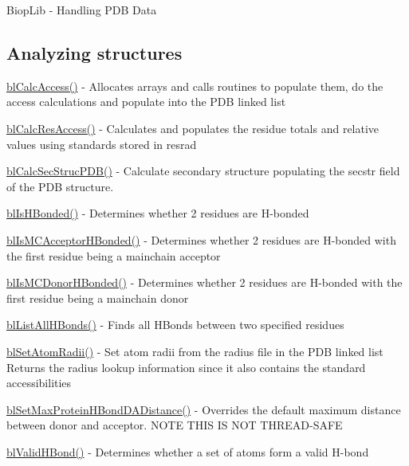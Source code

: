 Biop\-Lib -\/ Handling P\-D\-B Data

\subsection*{Analyzing structures }


\begin{DoxyItemize}
\item \hyperlink{access_8c_a25e95868bba0491487408f2a04f018cf}{bl\-Calc\-Access()} -\/ Allocates arrays and calls routines to populate them, do the access calculations and populate into the P\-D\-B linked list
\item \hyperlink{access_8c_a8665f8aad4742be11492028cfc816902}{bl\-Calc\-Res\-Access()} -\/ Calculates and populates the residue totals and relative values using standards stored in resrad
\item \hyperlink{secstr_8c_aca5046643e5b5b54b6c5732816ee2b5a}{bl\-Calc\-Sec\-Struc\-P\-D\-B()} -\/ Calculate secondary structure populating the secstr field of the P\-D\-B structure.
\item \hyperlink{hbond_8c_a0bbd4cd865d5a39fc21ab4bdfe1695e9}{bl\-Is\-H\-Bonded()} -\/ Determines whether 2 residues are H-\/bonded
\item \hyperlink{hbond_8c_af010eb27ce05f9682aab3fce3f20dea2}{bl\-Is\-M\-C\-Acceptor\-H\-Bonded()} -\/ Determines whether 2 residues are H-\/bonded with the first residue being a mainchain acceptor
\item \hyperlink{hbond_8c_ab479299672142677530f65463f2517d7}{bl\-Is\-M\-C\-Donor\-H\-Bonded()} -\/ Determines whether 2 residues are H-\/bonded with the first residue being a mainchain donor
\item \hyperlink{hbond_8c_a5c79884810e9b46ccf3e2e5fe4042125}{bl\-List\-All\-H\-Bonds()} -\/ Finds all H\-Bonds between two specified residues
\item \hyperlink{access_8c_ae697c1552c8004b355d84f2f72a4c6f9}{bl\-Set\-Atom\-Radii()} -\/ Set atom radii from the radius file in the P\-D\-B linked list Returns the radius lookup information since it also contains the standard accessibilities
\item \hyperlink{hbond_8c_a7d0d2bbcecd3cf7b6bc6fc0a19664e41}{bl\-Set\-Max\-Protein\-H\-Bond\-D\-A\-Distance()} -\/ Overrides the default maximum distance between donor and acceptor. N\-O\-T\-E T\-H\-I\-S I\-S N\-O\-T T\-H\-R\-E\-A\-D-\/\-S\-A\-F\-E
\item \hyperlink{hbond_8c_a2fdd1489eaa0df30d50ac2f222dc8f45}{bl\-Valid\-H\-Bond()} -\/ Determines whether a set of atoms form a valid H-\/bond
\end{DoxyItemize}


